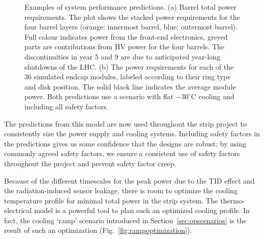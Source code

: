 \begin{figure}[ht]
\centering
{}\quad\quad
{}
\caption{Examples of system performance predictions. (a) Barrel total power requirements. The plot shows the stacked power requirements for the four barrel layers (orange: innermost barrel, blue: outermost barrel). Full colour indicates power from the front-end electronics, greyed parts are contributions from HV power for the four barrels. The discontinuities in year 5 and 9 are due to anticipated year-long shutdowns of the LHC. (b) The power requirements for each of the 36 simulated endcap modules, labeled according to their ring type and disk position. The solid black line indicates the average module power. Both predictions use a scenario with flat $-30^\circ$C cooling and including all safety factors.}
\label{fig:systemperformance}
\end{figure}

The predictions from this model are now used throughout the strip project to consistently size the power supply and cooling systems. Including safety factors in the predictions gives us some confidence that the designs are robust; by using commonly agreed safety factors, we ensure a consistent use of safety factors throughout the project and prevent safety factor creep.

Because of the different timescales for the peak power due to the TID effect and the radiation-induced sensor leakage, there is room to optimize the cooling temperature profile for minimal total power in the strip system. The thermo-electrical model is a powerful tool to plan such an optimized cooling profile. In fact, the cooling `ramp' scenario introduced in Section~\ref{sec:opscenarios} is the result of such an optimization (Fig.~\ref{fig:rampoptimization}).

